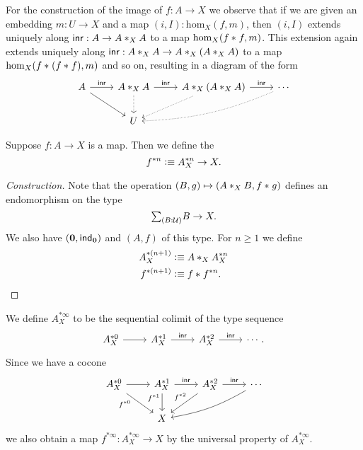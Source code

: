 For the construction of the image of $f:A\to X$ we observe that if we are given an embedding $m:U\to X$ and a map $(i,I):\mathrm{hom}_X(f,m)$, then $(i,I)$ extends uniquely along $\inr:A\to \join[X]{A}{A}$ to a map $\mathrm{hom}_X(\join{f}{f},m)$. This extension again extends uniquely along $\inr:\join[X]{A}{A}\to \join[X]{A}{(\join[X]{A}{A})}$ to a map $\mathrm{hom}_X(\join{f}{(\join{f}{f})},m)$ and so on, resulting in a diagram of the form
\begin{equation*}
\begin{tikzcd}
A \arrow[dr] \arrow[r,"\inr"] & \join[X]{A}{A} \arrow[d,densely dotted] \arrow[r,"\inr"] & \join[X]{A}{(\join[X]{A}{A})} \arrow[dl,densely dotted] \arrow[r,"\inr"] & \cdots \arrow[dll,densely dotted,bend left=10] \\
& U
\end{tikzcd}
\end{equation*}

\begin{defn}
Suppose $f:A\to X$ is a map. Then we define the  
\begin{equation*}
f^{\ast n}\defeq A_X^{\ast n}\to X.
\end{equation*}
\end{defn}

\begin{proof}[Construction]
Note that the operation $(B,g)\mapsto (\join[X]{A}{B},\join{f}{g})$ defines an endomorphism on the type
\begin{equation*}
\sm{B:\UU}B\to X.
\end{equation*}
We also have $(\emptyt,\ind{\emptyt})$ and $(A,f)$ of this type. For $n\geq 1$ we define
\begin{align*}
A_X^{\ast (n+1)} & \defeq \join[X]{A}{A_X^{\ast n}} \\
f^{\ast (n+1)} & \defeq \join{f}{f^{\ast n}}.\qedhere
\end{align*}
\end{proof}

\begin{defn}
We define $A_X^{\ast\infty}$ to be the sequential colimit of the type sequence
\begin{equation*}
\begin{tikzcd}
A_X^{\ast 0} \arrow[r] & A_X^{\ast 1} \arrow[r,"\inr"] & A_X^{\ast 2} \arrow[r,"\inr"] & \cdots.
\end{tikzcd}
\end{equation*}
Since we have a cocone
\begin{equation*}
\begin{tikzcd}
A_X^{\ast 0} \arrow[r] \arrow[dr,swap,"f^{\ast 0}" near start] & A_X^{\ast 1} \arrow[r,"\inr"] \arrow[d,swap,"f^{\ast 1}" near start] & A_X^{\ast 2} \arrow[r,"\inr"] \arrow[dl,swap,"f^{\ast 2}" xshift=1ex] & \cdots \arrow[dll,bend left=10] \\
& X
\end{tikzcd}
\end{equation*}
we also obtain a map $f^{\ast\infty}:A_X^{\ast\infty}\to X$ by the universal property of $A_X^{\ast\infty}$. 
\end{defn}

